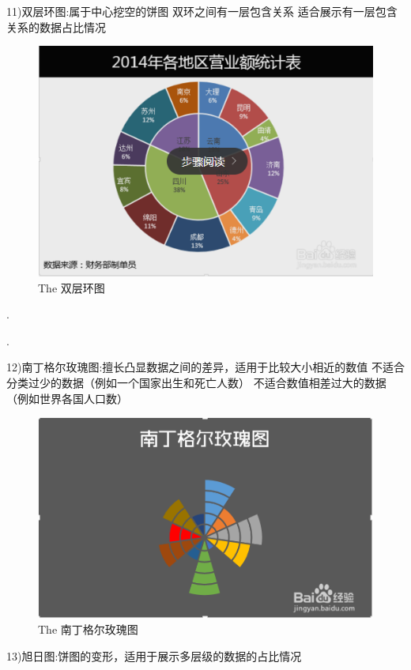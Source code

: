 \documentclass{article}
\begin{document}
\begin{itemize}
    		11)双层环图:属于中心挖空的饼图
    		双环之间有一层包含关系
    		适合展示有一层包含关系的数据占比情况
    		\par
    		\begin{figure}[h!]
    			\centering
    			\includegraphics[scale=0.7]{shaung}
    			\caption{The 双层环图}
    			\label{fig:shaung}
    		\end{figure}
    		.\par.\par
    		12)南丁格尔玫瑰图:擅长凸显数据之间的差异，适用于比较大小相近的数值
    		不适合分类过少的数据（例如一个国家出生和死亡人数）
    		不适合数值相差过大的数据（例如世界各国人口数）\par
    		\begin{figure}[h!]
    			\centering
    			\includegraphics[scale=0.7]{nan}
    			\caption{The 南丁格尔玫瑰图}
    			\label{fig:nan}
    		\end{figure}
    		13)旭日图:饼图的变形，适用于展示多层级的数据的占比情况

\end{itemize}
\end{document}

